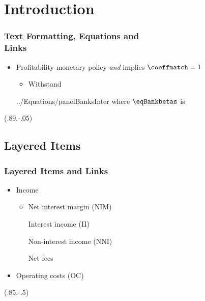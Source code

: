 \documentclass[12pt, aspectratio=169, xcolor=dvipsnames]{beamer}  %
\begin{document}



\section{Introduction}

 \begin{frame}[label=LinkA]
	\frametitle{Text Formatting, Equations and \\ \vspace{-.4cm} Links}
	\begin{itemize}
		\item Profitability \alert{monetary policy} \textit{and} implies \textcolor{red}{$\coeffmatch = 1$}
		\iftoggle{long}{\pause}{}
		\begin{itemize}
			\item Withstand 
		\end{itemize}
	 {../Equations/panelBanksInter}
	\vspace{-0.8cm}
	\quad where $\eqBankbetas$ is
	\end{itemize}
	\begin{textblock*}{3cm}(.89\textwidth,-.05\textheight)
		\hyperlink{LinkB}{}
	\end{textblock*}
\end{frame}

\subsection{Layered Items}

\begin{frame}[label=LinkB]
	\frametitle{Layered Items and Links}
	\begin{itemize}
		\item Income
		\begin{itemize}
				\item Net interest margin (NIM)
				\begin{itemize}
					\iftoggle{struct}{\item<2->}{\item} Interest income (II)
				\end{itemize}
				\iftoggle{struct}{\item<1->}{\item} Non-interest income (NNI)
				\begin{itemize}
					\iftoggle{long}{\item<2>}{\item} Net fees
				\end{itemize}
		\end{itemize}
		\item Operating costs (OC)
	\end{itemize}
	\begin{textblock*}{3cm}(.85\textwidth,-.5\textheight)
		\hyperlink{LinkA}{}
	\end{textblock*}
\end{frame}
\end{document}
